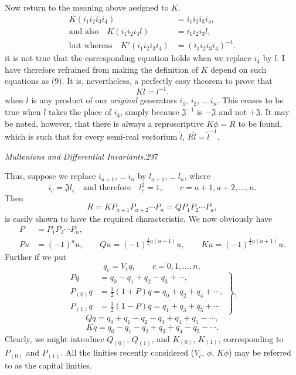 \documentclass[11pt]{article}
\begin{document}
\indent Now return to the meaning above assigned to $K$.
\begin{align*}K(i_1i_2i_3i_4)&=i_1i_2i_3i_4,\\ \text{and also}\quad K(i_1i_2i_3l)&=i_1i_2i_3l,\\ \text{but whereas}\quad K'(i_1i_2i_3i_4)&=(i_1i_2i_3i_4)^{-1}.\tag{9}\end{align*}
it is not true that the corresponding equation holds when we replace $i_4$ by $l$. I have therefore refrained from making the definition of $K$ depend on such equations as (9). It is, nevertheless, a perfectly easy theorem to prove that
\begin{equation}Kl=l^{-1}.\tag{10}\end{equation}
when $l$ is any product of our \emph{original} generators $i_1$, $i_2$, \ldots{} $i_n$. This ceases to be true when $l$ takes the place of $i_4$, simply because $\mathfrak J^{-1}$ is $-\mathfrak J$ and not $+\mathfrak J$. It may be noted, however, that there is always a reproscriptive $K\phi=R$ to be found, which is such that for every semi-real vectorium $\breve{l}$, $R\breve{l}=\breve{l}^{-1}$.

\newpage\thispagestyle{empty}
\begin{center}\textit{Multenions and Differential Invariants.}\hfill 297\end{center}
Thus, suppose we replace $i_{a+1}$, \ldots{} $i_n$ by $l_{a+1}$, \ldots{} $l_n$, where
\begin{equation}i_c=\mathfrak J l_c\quad\text{and therefore}\quad l_c^2=1,\qquad c=a+1,a+2,\ldots,n.\tag{11}\end{equation}
Then
\begin{equation}R=KP_{a+1}P_{a+2}\cdots P_n=QP_1P_2\cdots P_a,\tag{12}\end{equation}
is easily shown to have the required characteristic. We now obviously have
\begin{align}P&=P_1P_2\cdots P_n,\tag{13}\\ Pu&=(-1)^a u,\qquad Qu=(-1)^{\frac12a(a-1)}u,\qquad Ku=(-1)^{\frac12a(a+1)}u.\tag{14}\end{align}
Further if we put
\begin{equation}q_c=V_cq,\qquad c=0,1,\ldots,n,\tag{15}\end{equation}
\begin{equation}\left.\begin{aligned}Pq&=q_0-q_1+q_2-q_3+\cdots,\\P_{(0)}q&=\tfrac12(1+P)q=q_0+q_2+q_4+\cdots,\\P_{(1)}q&=\tfrac12(1-P)q=q_1+q_3+q_5+\cdots\end{aligned}\right\},\tag{16}\end{equation}
\begin{equation}Qq=q_0+q_1-q_2-q_3+q_4+q_5-\cdots,\tag{17}\end{equation}
\begin{equation}Kq=q_0-q_1-q_2+q_3+q_4-q_5-\cdots.\tag{18}\end{equation}
Clearly, we might introduce $Q_{(0)}$, $Q_{(1)}$, and $K_{(0)}$, $K_{(1)}$, corresponding to $P_{(0)}$ and $P_{(1)}$. All the linities recently considered ($V_c$, $\phi$, $K\phi$) may be referred to as the capital linities.
\end{document}
